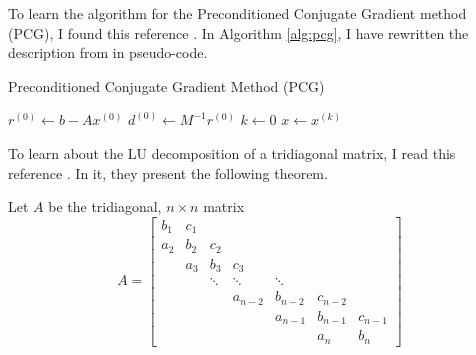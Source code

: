 \documentclass{homework}
\begin{document}
	\question
	\begin{alphaparts}
		
		\questionpart To learn the algorithm for the Preconditioned Conjugate Gradient method (PCG), I found this reference \cite{schewchuk_1994}. In Algorithm \ref{alg:pcg}, I have rewritten the description from \cite{schewchuk_1994} in pseudo-code.
		
		\begin{algorithm}[h]
			\caption{Preconditioned Conjugate Gradient Method (PCG)}
			\label{alg:pcg}
			$r^{(0)} \gets b - Ax^{(0)}$\;
			$d^{(0)} \gets M^{-1}r^{(0)}$\;
			$k \gets 0$\;
			$x \gets x^{(k)}$\;
		\end{algorithm}
		\questionpart To learn about the LU decomposition of a tridiagonal matrix, I read this reference \cite{gallier_2023}. In it, they present the following theorem.
		
		Let $A$ be the tridiagonal, $n\times n$ matrix
		\begin{equation}
			A = \left[\begin{matrix}
				b_1 & c_1 &        &         &         &         &         \\
				a_2 & b_2 & c_2    &         &         &         &         \\
				    & a_3 & b_3    & c_3     &         &         &         \\
				    &     & \ddots & \ddots  & \ddots  &         &         \\ 
				    &     &        & a_{n-2} & b_{n-2} & c_{n-2} &         \\
				    &     &        &         & a_{n-1} & b_{n-1} & c_{n-1} \\
				    &     &        &         &         & a_n     & b_n     
			\end{matrix}\right]
		\end{equation}
		

\end{alphaparts}
\end{document}
